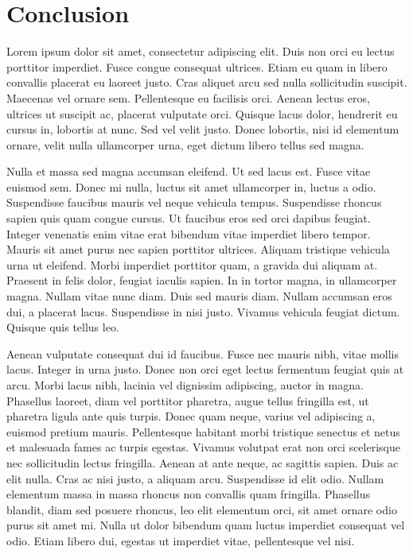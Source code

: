 \chapter{Conclusion}
Lorem ipsum dolor sit amet, consectetur adipiscing elit.
Duis non orci eu lectus porttitor imperdiet.
Fusce congue consequat ultrices.
Etiam eu quam in libero convallis placerat eu laoreet justo.
Cras aliquet arcu sed nulla sollicitudin suscipit.
Maecenas vel ornare sem.
Pellentesque eu facilisis orci.
Aenean lectus eros, ultrices ut suscipit ac, placerat vulputate orci.
Quisque lacus dolor, hendrerit eu cursus in, lobortis at nunc.
Sed vel velit justo.
Donec lobortis, nisi id elementum ornare, velit nulla ullamcorper urna, eget dictum libero tellus sed magna.

Nulla et massa sed magna accumsan eleifend.
Ut sed lacus est.
Fusce vitae euismod sem.
Donec mi nulla, luctus sit amet ullamcorper in, luctus a odio.
Suspendisse faucibus mauris vel neque vehicula tempus.
Suspendisse rhoncus sapien quis quam congue cursus.
Ut faucibus eros sed orci dapibus feugiat.
Integer venenatis enim vitae erat bibendum vitae imperdiet libero tempor.
Mauris sit amet purus nec sapien porttitor ultrices.
Aliquam tristique vehicula urna ut eleifend.
Morbi imperdiet porttitor quam, a gravida dui aliquam at.
Praesent in felis dolor, feugiat iaculis sapien.
In in tortor magna, in ullamcorper magna.
Nullam vitae nunc diam.
Duis sed mauris diam.
Nullam accumsan eros dui, a placerat lacus.
Suspendisse in nisi justo.
Vivamus vehicula feugiat dictum.
Quisque quis tellus leo.

Aenean vulputate consequat dui id faucibus.
Fusce nec mauris nibh, vitae mollis lacus.
Integer in urna justo.
Donec non orci eget lectus fermentum feugiat quis at arcu.
Morbi lacus nibh, lacinia vel dignissim adipiscing, auctor in magna.
Phasellus laoreet, diam vel porttitor pharetra, augue tellus fringilla est, ut pharetra ligula ante quis turpis.
Donec quam neque, varius vel adipiscing a, euismod pretium mauris.
Pellentesque habitant morbi tristique senectus et netus et malesuada fames ac turpis egestas.
Vivamus volutpat erat non orci scelerisque nec sollicitudin lectus fringilla.
Aenean at ante neque, ac sagittis sapien.
Duis ac elit nulla.
Cras ac nisi justo, a aliquam arcu.
Suspendisse id elit odio.
Nullam elementum massa in massa rhoncus non convallis quam fringilla.
Phasellus blandit, diam sed posuere rhoncus, leo elit elementum orci, sit amet ornare odio purus sit amet mi.
Nulla ut dolor bibendum quam luctus imperdiet consequat vel odio.
Etiam libero dui, egestas ut imperdiet vitae, pellentesque vel nisi.

